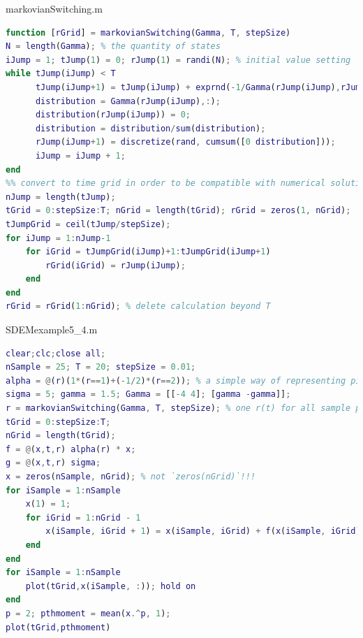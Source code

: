 \documentclass[10pt,aspectratio=43]{beamer}
\begin{document}
\begin{frame}[fragile]{markovianSwitching.m}
\begin{lstlisting}[language=matlab,
basicstyle=\ttfamily\scriptsize, 
numberstyle=\scriptsize]
function [rGrid] = markovianSwitching(Gamma, T, stepSize)
N = length(Gamma); % the quantity of states
iJump = 1; tJump(1) = 0; rJump(1) = randi(N); % initial value setting
while tJump(iJump) < T
      tJump(iJump+1) = tJump(iJump) + exprnd(-1/Gamma(rJump(iJump),rJump(iJump)));
      distribution = Gamma(rJump(iJump),:);
      distribution(rJump(iJump)) = 0;
      distribution = distribution/sum(distribution);
      rJump(iJump+1) = discretize(rand, cumsum([0 distribution]));
      iJump = iJump + 1;
end
%% convert to time grid in order to be compatible with numerical solutions
nJump = length(tJump);
tGrid = 0:stepSize:T; nGrid = length(tGrid); rGrid = zeros(1, nGrid);
tJumpGrid = ceil(tJump/stepSize);
for iJump = 1:nJump-1
    for iGrid = tJumpGrid(iJump)+1:tJumpGrid(iJump+1)
        rGrid(iGrid) = rJump(iJump);
    end
end
rGrid = rGrid(1:nGrid); % delete calculation beyond T
\end{lstlisting}
\end{frame}

\begin{frame}[fragile]{SDEMexample5\_4.m}
\begin{lstlisting}[language=matlab,
basicstyle=\ttfamily\scriptsize, 
numberstyle=\scriptsize]
clear;clc;close all;
nSample = 25; T = 20; stepSize = 0.01;
alpha = @(r)(1*(r==1)+(-1/2)*(r==2)); % a simple way of representing piecewise function
sigma = 5; gamma = 1.5; Gamma = [[-4 4]; [gamma -gamma]];
r = markovianSwitching(Gamma, T, stepSize); % one r(t) for all sample paths
tGrid = 0:stepSize:T;
nGrid = length(tGrid);
f = @(x,t,r) alpha(r) * x;
g = @(x,t,r) sigma;
x = zeros(nSample, nGrid); % not `zeros(nGrid)`!!!
for iSample = 1:nSample
    x(1) = 1;
    for iGrid = 1:nGrid - 1
        x(iSample, iGrid + 1) = x(iSample, iGrid) + f(x(iSample, iGrid), iGrid, r(iGrid)) * stepSize + g(x(iSample, iGrid), iGrid, r(iGrid)) * normrnd(0, stepSize);
    end
end
for iSample = 1:nSample
    plot(tGrid,x(iSample, :)); hold on
end
p = 2; pthmoment = mean(x.^p, 1);
plot(tGrid,pthmoment)
\end{lstlisting}
\end{frame}
\end{document}
